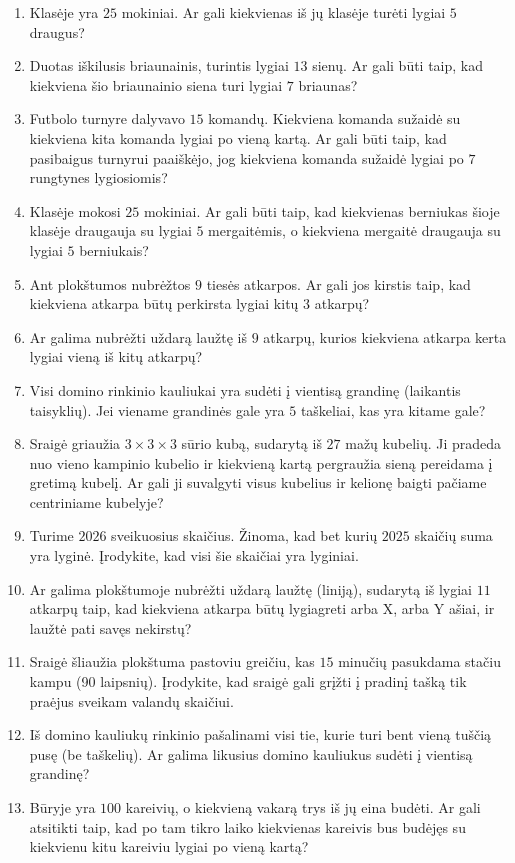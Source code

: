 \documentclass[11pt,a4paper]{scrartcl}
\begin{document}
\begin{enumerate}
    \item Klasėje yra $25$ mokiniai. Ar gali kiekvienas iš jų klasėje turėti lygiai $5$ draugus?
    \item Duotas iškilusis briaunainis, turintis lygiai $13$ sienų. Ar gali būti taip, kad kiekviena šio briaunainio siena turi lygiai $7$ briaunas?
    \item Futbolo turnyre dalyvavo $15$ komandų. Kiekviena komanda sužaidė su kiekviena kita komanda lygiai po vieną kartą. Ar gali būti taip, kad pasibaigus turnyrui paaiškėjo, jog kiekviena komanda sužaidė lygiai po $7$ rungtynes lygiosiomis?
    \item Klasėje mokosi $25$ mokiniai. Ar gali būti taip, kad kiekvienas berniukas šioje klasėje draugauja su lygiai $5$ mergaitėmis, o kiekviena mergaitė draugauja su lygiai $5$ berniukais?
    \item Ant plokštumos nubrėžtos $9$ tiesės atkarpos. Ar gali jos kirstis taip, kad kiekviena atkarpa būtų perkirsta lygiai kitų $3$ atkarpų?
    \item Ar galima nubrėžti uždarą laužtę iš $9$ atkarpų, kurios kiekviena atkarpa kerta lygiai vieną iš kitų atkarpų?
    \item Visi domino rinkinio kauliukai yra sudėti į vientisą grandinę (laikantis taisyklių). Jei viename grandinės gale yra $5$ taškeliai, kas yra kitame gale?
    \item Sraigė griaužia $3 \times 3 \times 3$ sūrio kubą, sudarytą iš $27$ mažų kubelių. Ji pradeda nuo vieno kampinio kubelio ir kiekvieną kartą pergraužia sieną pereidama į gretimą kubelį. Ar gali ji suvalgyti visus kubelius ir kelionę baigti pačiame centriniame kubelyje?
    \item Turime $2026$ sveikuosius skaičius. Žinoma, kad bet kurių $2025$ skaičių suma yra lyginė. Įrodykite, kad visi šie skaičiai yra lyginiai.
    \item Ar galima plokštumoje nubrėžti uždarą laužtę (liniją), sudarytą iš lygiai $11$ atkarpų taip, kad kiekviena atkarpa būtų lygiagreti arba X, arba Y ašiai, ir laužtė pati savęs nekirstų?
    \item Sraigė šliaužia plokštuma pastoviu greičiu, kas $15$ minučių pasukdama stačiu kampu (90 laipsnių). Įrodykite, kad sraigė gali grįžti į pradinį tašką tik praėjus sveikam valandų skaičiui.
    \item Iš domino kauliukų rinkinio pašalinami visi tie, kurie turi bent vieną tuščią pusę (be taškelių). Ar galima likusius domino kauliukus sudėti į vientisą grandinę?
    \item Būryje yra $100$ kareivių, o kiekvieną vakarą trys iš jų eina budėti. Ar gali atsitikti taip, kad po tam tikro laiko kiekvienas kareivis bus budėjęs su kiekvienu kitu kareiviu lygiai po vieną kartą?

\end{enumerate}
\end{document}
